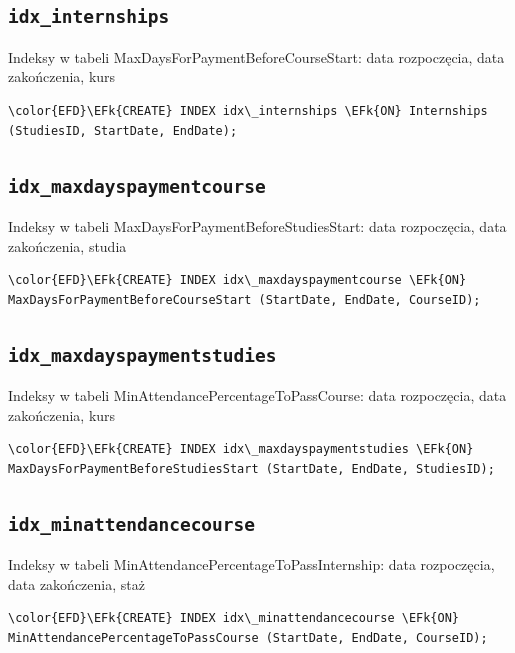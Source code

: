 \documentclass[11pt]{article}
\newcommand{\EFk}[1]{\textcolor{EFk}{\textbf{#1}}} %
\begin{document}
\subsection{\texttt{idx\_internships}}
\label{sec:org34cef3f}
Indeksy w tabeli MaxDaysForPaymentBeforeCourseStart: data rozpoczęcia, data zakończenia, kurs
\begin{Code}
\begin{Verbatim}
\color{EFD}\EFk{CREATE} INDEX idx\_internships \EFk{ON} Internships (StudiesID, StartDate, EndDate);
\end{Verbatim}
\end{Code}
\subsection{\texttt{idx\_maxdayspaymentcourse}}
\label{sec:org3944d3c}
Indeksy w tabeli MaxDaysForPaymentBeforeStudiesStart: data rozpoczęcia, data zakończenia, studia
\begin{Code}
\begin{Verbatim}
\color{EFD}\EFk{CREATE} INDEX idx\_maxdayspaymentcourse \EFk{ON} MaxDaysForPaymentBeforeCourseStart (StartDate, EndDate, CourseID);
\end{Verbatim}
\end{Code}
\subsection{\texttt{idx\_maxdayspaymentstudies}}
\label{sec:orgf709578}
Indeksy w tabeli MinAttendancePercentageToPassCourse: data rozpoczęcia, data zakończenia, kurs
\begin{Code}
\begin{Verbatim}
\color{EFD}\EFk{CREATE} INDEX idx\_maxdayspaymentstudies \EFk{ON} MaxDaysForPaymentBeforeStudiesStart (StartDate, EndDate, StudiesID);
\end{Verbatim}
\end{Code}
\subsection{\texttt{idx\_minattendancecourse}}
\label{sec:orgbe9bc70}
Indeksy w tabeli MinAttendancePercentageToPassInternship: data rozpoczęcia, data zakończenia, staż
\begin{Code}
\begin{Verbatim}
\color{EFD}\EFk{CREATE} INDEX idx\_minattendancecourse \EFk{ON} MinAttendancePercentageToPassCourse (StartDate, EndDate, CourseID);
\end{Verbatim}
\end{Code}
\end{document}
